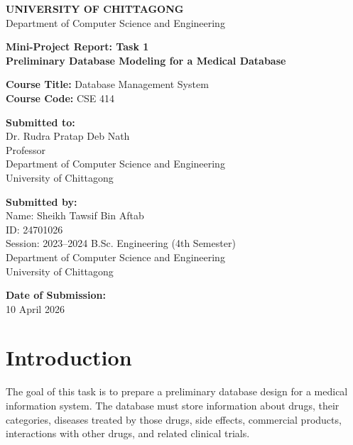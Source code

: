 \documentclass[12pt,a4paper]{article}
\begin{document}
\begin{center}
\textbf{UNIVERSITY OF CHITTAGONG}\\
Department of Computer Science and Engineering
\end{center}

\vspace{0.8cm}

\begin{center}
\textbf{\Large Mini-Project Report: Task 1}\\
\textbf{Preliminary Database Modeling for a Medical Database}
\end{center}

\vspace{0.8cm}

\textbf{Course Title:} Database Management System\\
\textbf{Course Code:} CSE 414

\vspace{0.8cm}

\textbf{Submitted to:}\\
Dr. Rudra Pratap Deb Nath\\
Professor\\
Department of Computer Science and Engineering\\
University of Chittagong

\vspace{0.8cm}

\textbf{Submitted by:}\\
Name: Sheikh Tawsif Bin Aftab\\
ID: 24701026\\
Session: 2023--2024 B.Sc. Engineering (4th Semester)\\
Department of Computer Science and Engineering\\
University of Chittagong

\vspace{0.8cm}

\textbf{Date of Submission:}\\
10 April 2026

\newpage

\section{Introduction}
The goal of this task is to prepare a preliminary database design for a medical information system.
The database must store information about drugs, their categories, diseases treated by those drugs,
side effects, commercial products, interactions with other drugs, and related clinical trials.
\end{document}
